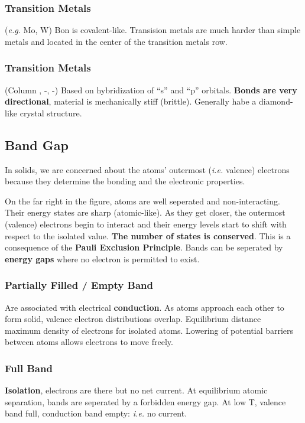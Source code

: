 \documentclass[a4paper, fontsize=8pt, landscape, DIV=1]{scrartcl}
\begin{document}
\begin{multicols*}{4}
  \subsubsection{Transition Metals}
  (\textit{e.g.} Mo, W) Bon is covalent-like. Transision metals are much harder than simple metals and located in the center of the transition metals row.
  \subsubsection{Transition Metals}
  (Column , -, -) Based on hybridization of ``s'' and ``p'' orbitals. \textbf{Bonds are very directional}, material is mechanically stiff (brittle). Generally habe a diamond-like crystal structure.

  \subsection{Band Gap}
  In solids, we are concerned about the atoms' outermost (\textit{i.e.} valence) electrons because they determine the bonding and the electronic properties.

  On the far right in the figure, atoms are well seperated and non-interacting. Their energy states are sharp (atomic-like). As they get closer, the outermost (valence) electrons begin to interact and their energy levels start to shift with respect to the isolated value. \textbf{The number of states is conserved}. This is a consequence of the \textbf{Pauli Exclusion Principle}. Bands can be seperated by \textbf{energy gaps} where no electron is permitted to exist.

  \subsubsection{Partially Filled / Empty Band}
  Are associated with electrical \textbf{conduction}. As atoms approach each other to form solid, valence electron distributions overlap. Equilibrium distance ~ maximum density of electrons for isolated atoms.  Lowering of potential barriers between atoms allows electrons to move freely.

  \subsubsection{Full Band}
  \textbf{Isolation}, electrons are there but no net current. At equilibrium atomic separation, bands are seperated by a forbidden energy gap. At low T, valence band full, conduction band empty: \textit{i.e.} no current.


\end{multicols*}
\end{document}
